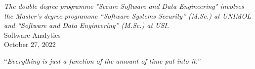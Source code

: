 \documentclass[11pt,twoside,english,singlespacing,headsepline,consistentlayout]{auxiliary/si-msc-thesis}
\theoremstyle{definition}
\begin{document}
\begin{titlepage}
\begin{center}
    \vfill
    
    
    \vfill
    

    {\footnotesize{\textsl{The double degree programme "Secure Software and Data Engineering" involves the Master's degree programme “Software Systems Security” (M.Sc.)
    at UNIMOL and “Software and Data Engineering” (M.Sc.) at USI.}}}\\[0.9cm]
    

    {\large Software Analytics}\\[0.1cm]
    {\large October 27, 2022}
    
    \vfill
    \end{center}
\end{titlepage}



\cleardoublepage
\vspace*{0.2\textheight}

\begin{flushright}
	\noindent\enquote{\itshape Everything is just a function of the amount of time put into it.}\bigbreak
\end{flushright}
    


%
\end{document}
